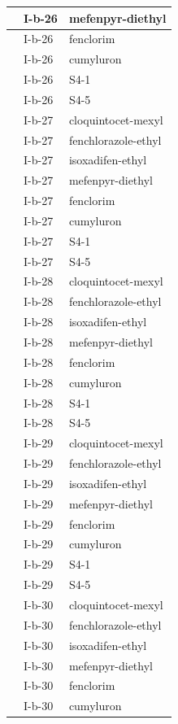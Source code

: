 \documentclass[11pt,a4paper]{article}
\begin{document}
\begin{table}[h]
\begin{tabular}{|l|l|l|}
 & I-b-26 & mefenpyr-diethyl \\ \hline
 & I-b-26 & fenclorim \\ \hline
 & I-b-26 & cumyluron \\ \hline
 & I-b-26 & S4-1 \\ \hline
 & I-b-26 & S4-5 \\ \hline
 & I-b-27 & cloquintocet-mexyl \\ \hline
 & I-b-27 & fenchlorazole-ethyl \\ \hline
 & I-b-27 & isoxadifen-ethyl \\ \hline
 & I-b-27 & mefenpyr-diethyl \\ \hline
 & I-b-27 & fenclorim \\ \hline
 & I-b-27 & cumyluron \\ \hline
 & I-b-27 & S4-1 \\ \hline
 & I-b-27 & S4-5 \\ \hline
 & I-b-28 & cloquintocet-mexyl \\ \hline
 & I-b-28 & fenchlorazole-ethyl \\ \hline
 & I-b-28 & isoxadifen-ethyl \\ \hline
 & I-b-28 & mefenpyr-diethyl \\ \hline
 & I-b-28 & fenclorim \\ \hline
 & I-b-28 & cumyluron \\ \hline
 & I-b-28 & S4-1 \\ \hline
 & I-b-28 & S4-5 \\ \hline
 & I-b-29 & cloquintocet-mexyl \\ \hline
 & I-b-29 & fenchlorazole-ethyl \\ \hline
 & I-b-29 & isoxadifen-ethyl \\ \hline
 & I-b-29 & mefenpyr-diethyl \\ \hline
 & I-b-29 & fenclorim \\ \hline
 & I-b-29 & cumyluron \\ \hline
 & I-b-29 & S4-1 \\ \hline
 & I-b-29 & S4-5 \\ \hline
 & I-b-30 & cloquintocet-mexyl \\ \hline
 & I-b-30 & fenchlorazole-ethyl \\ \hline
 & I-b-30 & isoxadifen-ethyl \\ \hline
 & I-b-30 & mefenpyr-diethyl \\ \hline
 & I-b-30 & fenclorim \\ \hline
 & I-b-30 & cumyluron \\ \hline

\end{tabular}
\end{table}
\end{document}
